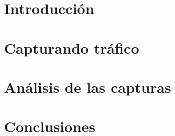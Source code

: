 \documentclass[11pt, a4paper]{article}
\begin{document}


\maketitle
\newpage

\section{Introducción}


\section{Capturando tráfico}


\section{Análisis de las capturas}


\section{Conclusiones}

\end{document}
